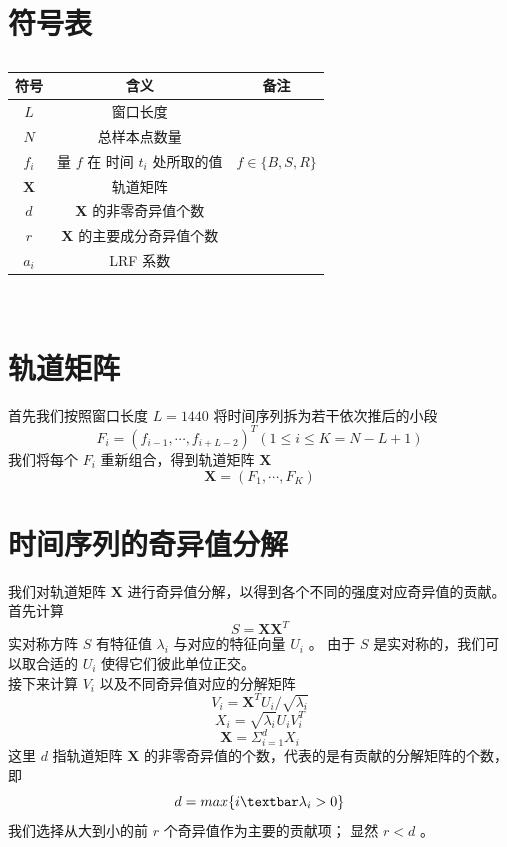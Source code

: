 \documentclass[a4paper]{article}
\begin{document}
\section*{符号表}
\begin{table}[H]
	\centering
	\caption{}
	\label{tab:ssa_symbols}
	\begin{tabular}{ccc}
		\hline
		符号 & 含义 & 备注 \\
		\hline
		$L$ & 窗口长度 & \\
		$N$ & 总样本点数量 & \\
		$f_i$ & 量 $f$ 在 时间 $t_i$ 处所取的值 & $f \in \{B, S, R\}$ \\
		$\textbf{X}$ & 轨道矩阵 & \\
		$d$ & \textbf{X} 的非零奇异值个数 & \\
		$r$ & \textbf{X} 的主要成分奇异值个数 & \\
		$a_i$ & LRF 系数 & \\
		\hline
	\end{tabular} \\
\end{table}
\section{轨道矩阵}
首先我们按照窗口长度 $L = 1440$ 将时间序列拆为若干依次推后的小段
\begin{equation}
	\label{eqn:F_i}
	F_i = (f_{i-1}, \cdots, f_{i+L-2})^T  (1 \leq i \leq K = N - L + 1)
\end{equation}
我们将每个 $F_i$ 重新组合，得到轨道矩阵 $\textbf{X}$
\begin{equation}
	\label{eqn:X}
	\textbf{X} = (F_1, \cdots, F_K)
\end{equation}

\section{时间序列的奇异值分解}
我们对轨道矩阵 $\textbf{X}$ 进行奇异值分解，以得到各个不同的强度对应奇异值的贡献。
首先计算
\begin{equation}
	\label{eqn:S}
	S = \textbf{X} \textbf{X}^T
\end{equation}
实对称方阵 $S$ 有特征值 $\lambda_i$ 与对应的特征向量 $U_i$ 。
由于 $S$ 是实对称的，我们可以取合适的 $U_i$ 使得它们彼此单位正交。
\\
\indent 接下来计算 $V_i$ 以及不同奇异值对应的分解矩阵
\begin{equation}
	\label{eqn:V_i}
	V_i = \textbf{X}^T U_i / \sqrt{\lambda_i}
\end{equation}
\begin{equation}
	\label{eqn:X_i}
	\textbf{$X_i$} = \sqrt{\lambda_i} U_i V_i^T
\end{equation}
\begin{equation}
	\label{eqn:SVD_expanded}
	\textbf{X} = \Sigma_{i=1}^d \textbf{$X_i$}
\end{equation}
这里 $d$ 指轨道矩阵 $\textbf{X}$ 的非零奇异值的个数，代表的是有贡献的分解矩阵的个数，即
\begin{equation}
	\label{eqn:non-zero-char-d}
	d = max\{i \textbar \lambda_i > 0\}
\end{equation}
我们选择从大到小的前 $r$ 个奇异值作为主要的贡献项；
显然 $r < d$ 。
\end{document}
